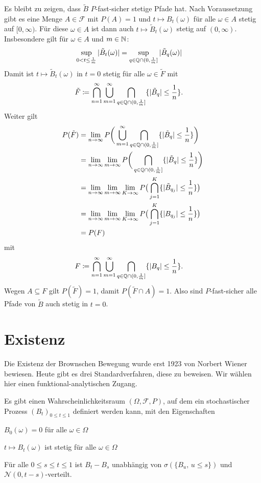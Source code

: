 \documentclass[a4paper,twoside,DIV15,BCOR12mm]{scrbook}
\newcommand{\cF}{\mathcal F}
\begin{document}
\begin{beweis}
Es bleibt zu zeigen, dass $\tilde B$ $P$-fast-sicher stetige Pfade hat. Nach Voraussetzung gibt es eine Menge $A\in \cF$ mit $P(A)=1$ und $t\mapsto B_t(\omega)$ für alle $\omega \in A$ stetig auf $[0,\infty)$. Für diese $\omega\in A$ ist dann auch $t\mapsto \tilde B_t(\omega)$ stetig auf $(0,\infty)$. Insbesondere gilt für $\omega\in A$ und $m\in \mathbb{N}$:
\begin{align*}
\sup_{0<t\le \frac 1m} |\tilde B_t(\omega)| &=
\sup_{q\in \mathbb{Q} \cap (0,\frac1m]} |\tilde B_q(\omega)|
\end{align*}
Damit ist $t\mapsto \tilde B_t(\omega)$ in $t=0$ stetig für alle $\omega \in \tilde F$ mit 
\begin{align*}
\tilde F &\da \bigcap_{n=1}^\infty \bigcup_{m=1}^\infty \bigcap_{q\in \MdQ\cap(0,\frac 1m]} \{|\tilde B_q|\le \frac 1n\}.
\end{align*}
Weiter gilt 
\begin{align*}
P(\tilde F) &= \lim_{n\to\infty} P\bigg(\bigcup_{m=1}^\infty \bigcap_{q\in \mathbb{Q}\cap(0,\frac 1m]} \{|\tilde B_q|\le \frac 1n\}\bigg) \\
&= \lim_{n\to \infty} \lim_{m\to \infty} P\bigg(\bigcap_{q\in \mathbb{Q}\cap(0,\frac 1m]} \{|\tilde B_q|\le \frac 1n\}\bigg) \\
&= \lim_{n\to \infty} \lim_{m\to \infty} \lim_{K\to \infty}  P\big(\bigcap_{j=1}^K \{|\tilde B_{q_j}|\le \frac 1n\}\big) \\
&= \lim_{n\to \infty} \lim_{m\to \infty} \lim_{K\to \infty}  P\big(\bigcap_{j=1}^K \{|B_{q_j}|\le \frac 1n\}\big) \\
&= P(F)
\end{align*}
mit 
\begin{align*}
F &\da \bigcap_{n=1}^\infty \bigcup_{m=1}^\infty \bigcap_{q\in \MdQ\cap(0,\frac 1m]} \{|B_q|\le \frac 1n\}.
\end{align*}
Wegen $A\subseteq F$ gilt $P(\tilde F)=1$, damit $P(\tilde F\cap A)=1$. Also sind $P$-fast-sicher alle Pfade von $\tilde B$ auch stetig in $t=0$.
\end{beweis}

\section{Existenz}

Die Existenz der Brownschen Bewegung wurde erst 1923 von Norbert Wiener bewiesen. Heute gibt es drei Standardverfahren, diese zu beweisen. Wir wählen hier einen funktional-analytischen Zugang.

\begin{satz}
Es gibt einen Wahrscheinlichkeitsraum $(\Omega, \cF, P)$, auf dem ein stochastischer Prozess $(B_t)_{0\le t \le 1}$ definiert werden kann, mit den Eigenschaften
\begin{enuma}
\item $B_0(\omega) = 0$ für alle $\omega\in \Omega$
\item $t\mapsto B_t(\omega)$ ist stetig für alle $\omega\in\Omega$
\item Für alle $0\le s\le t\le 1$ ist $B_t-B_s$ unabhängig von $\sigma(\{B_u,\,u\le s\})$ und $\mathcal N(0,t-s)$-verteilt.
\end{enuma}
\end{satz}
\end{document}
